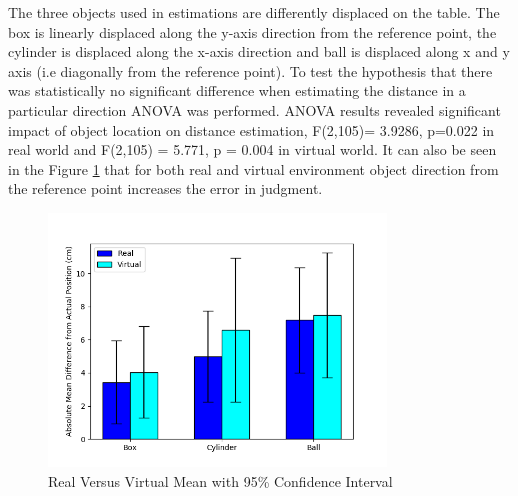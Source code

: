 The three objects used in estimations are differently displaced on the table. The box is linearly displaced along the y-axis direction from the reference point, the cylinder is displaced along the x-axis direction and ball is displaced along x and y axis (i.e diagonally from the reference point). To test the hypothesis that there was statistically no significant difference when estimating the distance in a particular direction ANOVA was performed. ANOVA results revealed significant impact of object location on distance estimation, F(2,105)= 3.9286, p=0.022 in real world and F(2,105) = 5.771, p = 0.004 in virtual world. It can also be seen in the Figure \ref{fig:graph1} that for both real and virtual environment object direction from the reference point increases the error in judgment.  
\begin{figure}[h]
    \centering
    \includegraphics[width=0.8\textwidth]{./images/verbal101.png}
    \caption{Real Versus Virtual Mean with 95\% Confidence Interval}
    \label{fig:graph1}
\end{figure}
